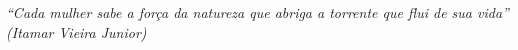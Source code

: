 \begin{epigrafe}
    \vspace*{\fill}
	\begin{flushright}
		\textit{``Cada mulher sabe a força da natureza que abriga a torrente que flui de sua vida''\\
		(Itamar Vieira Junior)}
	\end{flushright}
\end{epigrafe}